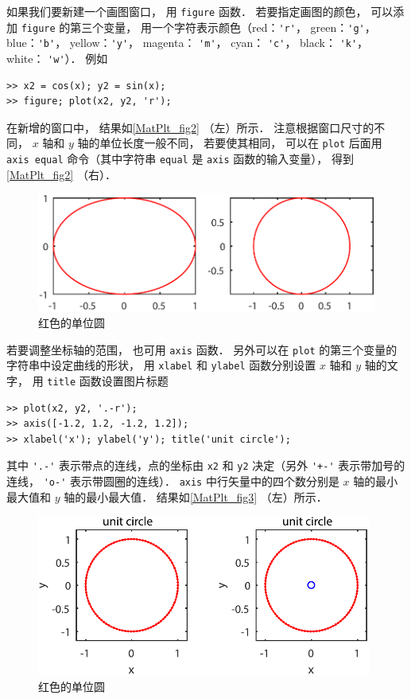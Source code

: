 如果我们要新建一个画图窗口， 用 \lstinline|figure| 函数． 若要指定画图的颜色， 可以添加 \lstinline|figure| 的第三个变量， 用一个字符表示颜色（red：\lstinline|'r'|， green：\lstinline|'g'|， blue：\lstinline|'b'|， yellow：\lstinline|'y'|， magenta： \lstinline|'m'|， cyan： \lstinline|'c'|， black： \lstinline|'k'|， white： \lstinline|'w'|）． 例如
\begin{lstlisting}[language=MatlabCom]
>> x2 = cos(x); y2 = sin(x);
>> figure; plot(x2, y2, 'r');
\end{lstlisting}
在新增的窗口中， 结果如\autoref{MatPlt_fig2} （左）所示． 注意根据窗口尺寸的不同， $x$ 轴和 $y$ 轴的单位长度一般不同， 若要使其相同， 可以在 \lstinline|plot| 后面用 \lstinline|axis equal| 命令（其中字符串 \lstinline|equal| 是 \lstinline|axis| 函数的输入变量）， 得到\autoref{MatPlt_fig2} （右）．
\begin{figure}[ht]
\centering
\includegraphics[width=13cm]{./figures/MatPlt_2.pdf}
\caption{红色的单位圆} \label{MatPlt_fig2}
\end{figure}
若要调整坐标轴的范围， 也可用 \lstinline|axis| 函数． 另外可以在 \lstinline|plot| 的第三个变量的字符串中设定曲线的形状， 用 \lstinline|xlabel| 和 \lstinline|ylabel| 函数分别设置 $x$ 轴和 $y$ 轴的文字， 用 \lstinline|title| 函数设置图片标题
\begin{lstlisting}[language=MatlabCom]
>> plot(x2, y2, '.-r');
>> axis([-1.2, 1.2, -1.2, 1.2]);
>> xlabel('x'); ylabel('y'); title('unit circle');
\end{lstlisting}
其中 \lstinline|'.-'| 表示带点的连线，点的坐标由 \lstinline|x2| 和 \lstinline|y2| 决定（另外 \lstinline|'+-'| 表示带加号的连线， \lstinline|'o-'| 表示带圆圈的连线）． \lstinline|axis| 中行矢量中的四个数分别是 $x$ 轴的最小最大值和 $y$ 轴的最小最大值． 结果如\autoref{MatPlt_fig3} （左）所示．
\begin{figure}[ht]
\centering
\includegraphics[width=11cm]{./figures/MatPlt_3.pdf}
\caption{红色的单位圆} \label{MatPlt_fig3}
\end{figure}

